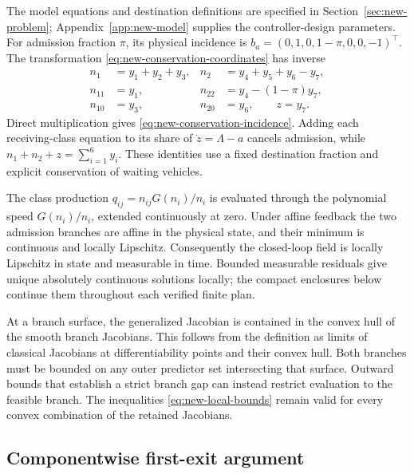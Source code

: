 \documentclass[journal,10pt]{IEEEtran}
\newcommand{\appref}[1]{Appendix~\ref{#1}}
\begin{document}
The model equations and destination definitions are specified in
Section~\ref{sec:new-problem}; \appref{app:new-model} supplies the controller-design
parameters. For admission fraction $\pi$, its physical incidence is
$b_a=(0,1,0,1-\pi,0,0,-1)^\top$. The transformation
\eqref{eq:new-conservation-coordinates} has inverse
\begin{equation}
 \begin{aligned}
 n_1&=y_1+y_2+y_3,&
 n_2&=y_4+y_5+y_6-y_7,\\
 n_{11}&=y_1,&n_{22}&=y_4-(1-\pi)y_7,\\
 n_{10}&=y_3,&n_{20}&=y_6,\qquad z=y_7.
 \end{aligned}
 \label{eq:new-inverse-coordinates}
\end{equation}
Direct multiplication gives \eqref{eq:new-conservation-incidence}. Adding
each receiving-class equation to its share of $\dot z=\Lambda-a$ cancels
admission, while $n_1+n_2+z=\sum_{i=1}^{6}y_i$. These identities use a fixed
destination fraction and explicit conservation of waiting vehicles.

The class production $q_{ij}=n_{ij}G(n_i)/n_i$ is evaluated through the
polynomial speed $G(n_i)/n_i$, extended continuously at zero. Under affine
feedback the two admission branches are affine in the physical state, and
their minimum is continuous and locally Lipschitz. Consequently the
closed-loop field is locally Lipschitz in state and measurable in time.
Bounded measurable residuals give unique absolutely continuous solutions
locally; the compact enclosures below continue them throughout each verified
finite plan.

At a branch surface, the generalized Jacobian is contained in the convex hull
of the smooth branch Jacobians. This follows from the definition as limits
of classical Jacobians at differentiability points and their convex hull.
Both branches must be bounded on any outer predictor set intersecting that
surface. Outward bounds that establish a strict branch gap can instead
restrict evaluation to the feasible branch. The inequalities
\eqref{eq:new-local-bounds} remain valid for every convex combination of the
retained Jacobians.

\subsection{Componentwise first-exit argument}
\end{document}
